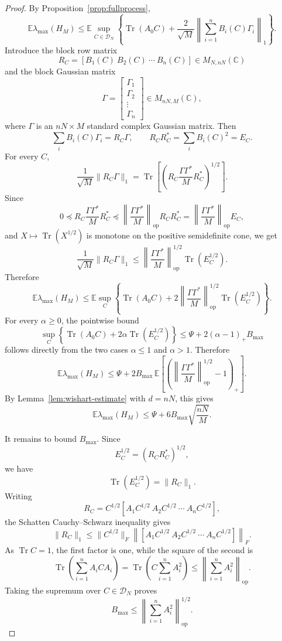 \documentclass{article}
\newcommand{\C}{\mathbb C}
\newcommand{\E}{\mathbb E}
\newcommand{\DN}{\mathcal D_N}
\newcommand{\op}{\mathrm{op}}
\newcommand{\Arow}{\left\|\sum_{i=1}^n A_i^2\right\|_{\op}^{1/2}}
\DeclareMathOperator{\Tr}{Tr}
\begin{document}
\begin{proof}
	By Proposition~\ref{prop:fullprocess},
	\[
		\E\lambda_{\max}(H_M)
		\le
		\E\sup_{C\in\DN}
		\left\{
		\Tr(A_0C)+\frac2{\sqrt M}\left\|\sum_{i=1}^nB_i(C)\Gamma_i\right\|_1
		\right\}.
	\]
	Introduce the block row matrix
	\[
		R_C=[B_1(C)\ B_2(C)\ \cdots\ B_n(C)]\in M_{N,nN}(\C)
	\]
	and the block Gaussian matrix
	\[
		\Gamma=\begin{bmatrix}\Gamma_1\\ \Gamma_2\\ \vdots\\ \Gamma_n\end{bmatrix}
		\in M_{nN,M}(\C),
	\]
	where $\Gamma$ is an $nN\times M$ standard complex Gaussian matrix.
	Then
	\[
		\sum_iB_i(C)\Gamma_i=R_C\Gamma,
		\qquad
		R_CR_C^*=\sum_iB_i(C)^2=E_C.
	\]
	For every $C$,
	\[
		\frac1{\sqrt M}\|R_C\Gamma\|_1
		=\Tr\left[\left(R_C\frac{\Gamma\Gamma^*}{M}R_C^*\right)^{1/2}\right].
	\]
	Since
	\[
		0\preceq R_C\frac{\Gamma\Gamma^*}{M}R_C^*
		\preceq
		\left\|\frac{\Gamma\Gamma^*}{M}\right\|_{\op}R_CR_C^*
		=
		\left\|\frac{\Gamma\Gamma^*}{M}\right\|_{\op}E_C,
	\]
	and $X\mapsto\Tr(X^{1/2})$ is monotone on the positive semidefinite cone, we get
	\[
		\frac1{\sqrt M}\|R_C\Gamma\|_1
		\le
		\left\|\frac{\Gamma\Gamma^*}{M}\right\|_{\op}^{1/2}\Tr(E_C^{1/2}).
	\]
	Therefore
	\[
		\E\lambda_{\max}(H_M)
		\le
		\E\sup_C
		\left\{
		\Tr(A_0C)+
		2\left\|\frac{\Gamma\Gamma^*}{M}\right\|_{\op}^{1/2}
		\Tr(E_C^{1/2})
		\right\}.
	\]
	For every $\alpha\ge0$, the pointwise bound
	\[
		\sup_C
		\left\{
		\Tr(A_0C)+2\alpha\Tr(E_C^{1/2})
		\right\}
		\le
		\Psi+2(\alpha-1)_+B_{\max}
	\]
	follows directly from the two cases $\alpha\le1$ and $\alpha>1$.
	Therefore
	\[
		\E\lambda_{\max}(H_M)
		\le
		\Psi+2B_{\max}\,
		\E\left[
			\left(
			\left\|\frac{\Gamma\Gamma^*}{M}\right\|_{\op}^{1/2}-1
			\right)_+
			\right].
	\]
	By Lemma~\ref{lem:wishart-estimate} with
	$d=nN$, this gives
	\[
		\E\lambda_{\max}(H_M)
		\le
		\Psi+6B_{\max}\sqrt{\frac{nN}{M}}.
	\]

	It remains to bound $B_{\max}$.  Since
	\[
		E_C^{1/2}=(R_CR_C^*)^{1/2},
	\]
	we have
	\[
		\Tr(E_C^{1/2})=\|R_C\|_1.
	\]
	Writing
	\[
		R_C=C^{1/2}[A_1C^{1/2}\ A_2C^{1/2}\ \cdots\ A_nC^{1/2}],
	\]
	the Schatten Cauchy--Schwarz inequality gives
	\[
		\|R_C\|_1
		\le
		\|C^{1/2}\|_F
		\left\|[A_1C^{1/2}\ A_2C^{1/2}\ \cdots\ A_nC^{1/2}]\right\|_F .
	\]
	As $\Tr C=1$, the first factor is one, while the square of the second is
	\[
		\Tr\left(\sum_{i=1}^n A_iCA_i\right)
		=
		\Tr\left(C\sum_{i=1}^n A_i^2\right)
		\le
		\left\|\sum_{i=1}^n A_i^2\right\|_{\op}.
	\]
	Taking the supremum over $C\in\DN$ proves
	\[
		B_{\max}\le \Arow.
	\]
\end{proof}
\end{document}
